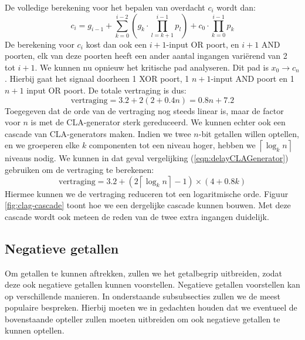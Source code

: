 De volledige berekening voor het bepalen van overdacht $c_i$ wordt dan:
\begin{equation}
c_i=g_{i-1}+\displaystyle\sum_{k=0}^{i-2}{\left(g_k\cdot\displaystyle\prod_{l=k+1}^{i-1}{p_l}\right)}+c_0\cdot\displaystyle\prod_{k=0}^{i-1}{p_k}
\end{equation}
De berekening voor $c_i$ kost dan ook een $i+1$-input OR poort, en $i+1$ AND poorten, elk van deze poorten heeft een ander aantal ingangen vari\"erend van 2 tot $i+1$. We kunnen nu opnieuw het kritische pad analyseren. Dit pad is $x_0\rightarrow c_n$. Hierbij gaat het signaal doorheen 1 XOR poort, 1 $n+1$-input AND poort en 1 $n+1$ input OR poort. De totale vertraging is dus:
\begin{equation}
\mbox{vertraging}=3.2+2\left(2+0.4n\right)=0.8n+7.2
\label{eqn:delayCLAGenerator}
\end{equation}
Toegegeven dat de orde van de vertraging nog steeds linear is, maar de factor voor $n$ is met de CLA-generator sterk gereduceerd. We kunnen echter ook een cascade van CLA-generators maken. Indien we twee $n$-bit getallen willen optellen, en we groeperen elke $k$ componenten tot een niveau hoger, hebben we $\left\lceil\log_kn\right\rceil$ niveaus nodig. We kunnen in dat geval vergelijking (\ref{eqn:delayCLAGenerator}) gebruiken om de vertraging te berekenen:
\begin{equation}
\mbox{vertraging}=3.2+\left(2\left\lceil\log_kn\right\rceil-1\right)\times\left(4+0.8k\right)
\end{equation}
Hiermee kunnen we de vertraging reduceren tot een logaritmische orde. Figuur \ref{fig:clag-cascade} toont hoe we een dergelijke cascade kunnen bouwen. Met deze cascade wordt ook meteen de reden van de twee extra ingangen duidelijk.
\subsection{Negatieve getallen}
Om getallen te kunnen aftrekken, zullen we het getalbegrip uitbreiden, zodat deze ook negatieve getallen kunnen voorstellen. Negatieve getallen voorstellen kan op verschillende manieren. In onderstaande subsubsecties zullen we de meest populaire bespreken. Hierbij moeten we in gedachten houden dat we eventueel de bovenstaande opteller zullen moeten uitbreiden om ook negatieve getallen te kunnen optellen.
